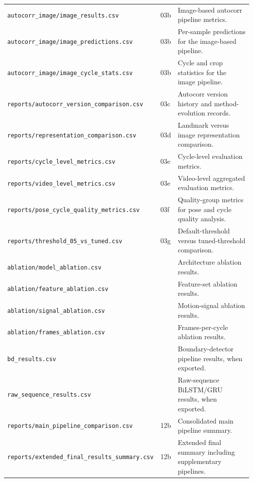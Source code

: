 \begin{table}[htbp]
\begin{tabularx}{\textwidth}{
>{\raggedright\arraybackslash}p{}
>{\raggedright\arraybackslash}p{}
>{\raggedright\arraybackslash}X}
\texttt{autocorr\_image/image\_results.csv} & 03b & Image-based autocorr pipeline metrics. \\
\texttt{autocorr\_image/image\_predictions.csv} & 03b & Per-sample predictions for the image-based pipeline. \\
\texttt{autocorr\_image/image\_cycle\_stats.csv} & 03b & Cycle and crop statistics for the image pipeline. \\
\texttt{reports/autocorr\_version\_comparison.csv} & 03c & Autocorr version history and method-evolution records. \\
\texttt{reports/representation\_comparison.csv} & 03d & Landmark versus image representation comparison. \\
\texttt{reports/cycle\_level\_metrics.csv} & 03e & Cycle-level evaluation metrics. \\
\texttt{reports/video\_level\_metrics.csv} & 03e & Video-level aggregated evaluation metrics. \\
\texttt{reports/pose\_cycle\_quality\_metrics.csv} & 03f & Quality-group metrics for pose and cycle quality analysis. \\
\texttt{reports/threshold\_05\_vs\_tuned.csv} & 03g & Default-threshold versus tuned-threshold comparison. \\
\texttt{ablation/model\_ablation.csv} & 04 & Architecture ablation results. \\
\texttt{ablation/feature\_ablation.csv} & 05 & Feature-set ablation results. \\
\texttt{ablation/signal\_ablation.csv} & 06 & Motion-signal ablation results. \\
\texttt{ablation/frames\_ablation.csv} & 07 & Frames-per-cycle ablation results. \\
\texttt{bd\_results.csv} & 08 & Boundary-detector pipeline results, when exported. \\
\texttt{raw\_sequence\_results.csv} & 09 & Raw-sequence BiLSTM/GRU results, when exported. \\
\texttt{reports/main\_pipeline\_comparison.csv} & 12b & Consolidated main pipeline summary. \\
\texttt{reports/extended\_final\_results\_summary.csv} & 12b & Extended final summary including supplementary pipelines. \\
\bottomrule
\end{tabularx}
\end{table}


